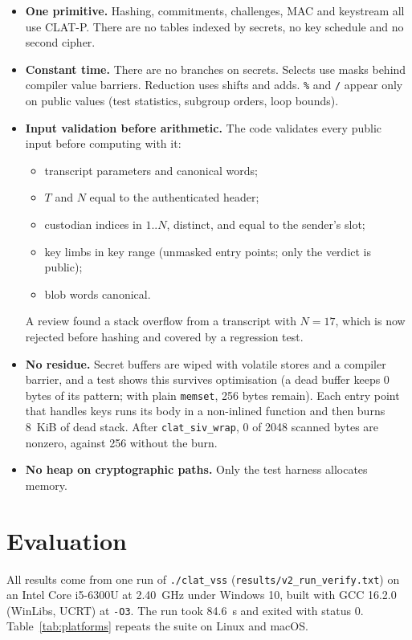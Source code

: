 \documentclass[10pt,a4paper]{article}
\newcommand{\code}[1]{\texttt{#1}}
\theoremstyle{definition}
\theoremstyle{remark}
\begin{document}
\begin{itemize}
  \item \textbf{One primitive.} Hashing, commitments, challenges, MAC and keystream all use CLAT-P. There are no tables indexed by secrets, no key schedule and no second cipher.
  \item \textbf{Constant time.} There are no branches on secrets. Selects use masks behind compiler value barriers. Reduction uses shifts and adds. \code{\%} and \code{/} appear only on public values (test statistics, subgroup orders, loop bounds).
  \item \textbf{Input validation before arithmetic.} The code validates every public input before computing with it:
  \begin{itemize}
    \item transcript parameters and canonical words;
    \item $T$ and $N$ equal to the authenticated header;
    \item custodian indices in $1..N$, distinct, and equal to the sender's slot;
    \item key limbs in key range (unmasked entry points; only the verdict is public);
    \item blob words canonical.
  \end{itemize}
  A review found a stack overflow from a transcript with $N = 17$, which is now rejected before hashing and covered by a regression test.
  \item \textbf{No residue.} Secret buffers are wiped with volatile stores and a compiler barrier, and a test shows this survives optimisation (a dead buffer keeps 0 bytes of its pattern; with plain \code{memset}, 256 bytes remain). Each entry point that handles keys runs its body in a non-inlined function and then burns 8~KiB of dead stack. After \code{clat\_siv\_wrap}, 0 of 2048 scanned bytes are nonzero, against 256 without the burn.
  \item \textbf{No heap on cryptographic paths.} Only the test harness allocates memory.
\end{itemize}

\section{Evaluation}\label{sec:eval}

All results come from one run of \code{./clat\_vss} (\code{results/v2\_run\_verify.txt}) on an Intel Core i5-6300U at 2.40~GHz under Windows 10, built with GCC 16.2.0 (WinLibs, UCRT) at \code{-O3}. The run took 84.6~s and exited with status 0. Table~\ref{tab:platforms} repeats the suite on Linux and macOS.
\end{document}
